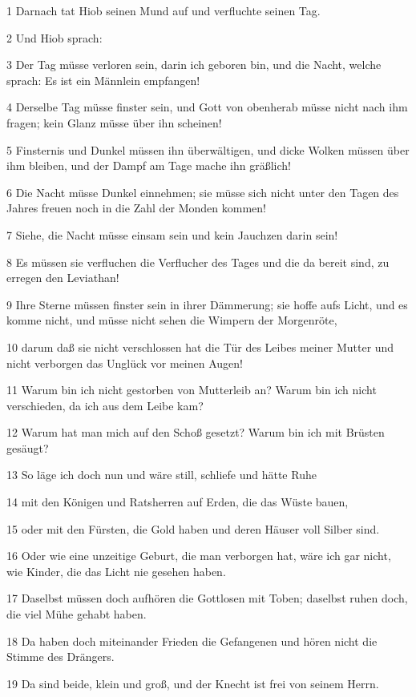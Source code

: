 \par 1 Darnach tat Hiob seinen Mund auf und verfluchte seinen Tag.
\par 2 Und Hiob sprach:
\par 3 Der Tag müsse verloren sein, darin ich geboren bin, und die Nacht, welche sprach: Es ist ein Männlein empfangen!
\par 4 Derselbe Tag müsse finster sein, und Gott von obenherab müsse nicht nach ihm fragen; kein Glanz müsse über ihn scheinen!
\par 5 Finsternis und Dunkel müssen ihn überwältigen, und dicke Wolken müssen über ihm bleiben, und der Dampf am Tage mache ihn gräßlich!
\par 6 Die Nacht müsse Dunkel einnehmen; sie müsse sich nicht unter den Tagen des Jahres freuen noch in die Zahl der Monden kommen!
\par 7 Siehe, die Nacht müsse einsam sein und kein Jauchzen darin sein!
\par 8 Es müssen sie verfluchen die Verflucher des Tages und die da bereit sind, zu erregen den Leviathan!
\par 9 Ihre Sterne müssen finster sein in ihrer Dämmerung; sie hoffe aufs Licht, und es komme nicht, und müsse nicht sehen die Wimpern der Morgenröte,
\par 10 darum daß sie nicht verschlossen hat die Tür des Leibes meiner Mutter und nicht verborgen das Unglück vor meinen Augen!
\par 11 Warum bin ich nicht gestorben von Mutterleib an? Warum bin ich nicht verschieden, da ich aus dem Leibe kam?
\par 12 Warum hat man mich auf den Schoß gesetzt? Warum bin ich mit Brüsten gesäugt?
\par 13 So läge ich doch nun und wäre still, schliefe und hätte Ruhe
\par 14 mit den Königen und Ratsherren auf Erden, die das Wüste bauen,
\par 15 oder mit den Fürsten, die Gold haben und deren Häuser voll Silber sind.
\par 16 Oder wie eine unzeitige Geburt, die man verborgen hat, wäre ich gar nicht, wie Kinder, die das Licht nie gesehen haben.
\par 17 Daselbst müssen doch aufhören die Gottlosen mit Toben; daselbst ruhen doch, die viel Mühe gehabt haben.
\par 18 Da haben doch miteinander Frieden die Gefangenen und hören nicht die Stimme des Drängers.
\par 19 Da sind beide, klein und groß, und der Knecht ist frei von seinem Herrn.
